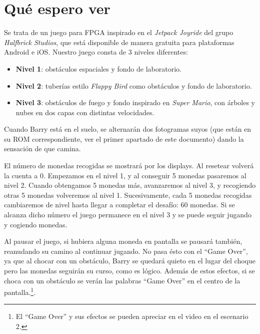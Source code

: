 \documentclass[11pt, a4paper, spanish, openright, twoside]{book}
\begin{document}
\section{Qué espero ver}
Se trata de un juego para FPGA inspirado en el  \emph{Jetpack Joyride} del grupo  \emph{Halfbrick Studios}, que está disponible de manera gratuita para plataformas Android e iOS. Nuestro juego consta de 3 niveles diferentes:

\begin{itemize}
	\item \textbf{Nivel 1}: obstáculos espaciales y fondo de laboratorio.
	\item \textbf{Nivel 2}: tuberías estilo \emph{Flappy Bird} como obstáculos y fondo de laboratorio.
	\item \textbf{Nivel 3}: obstáculos de fuego y fondo inspirado en \emph{Super Mario}, con árboles y nubes en dos capas con distintas velocidades.
\end{itemize}

Cuando Barry está en el suelo, se alternarán dos fotogramas suyos (que están en su ROM correspondiente, ver el primer apartado de este documento) dando la sensación de que camina. 

El número de monedas recogidas se mostrará por los displays. Al resetear volverá la cuenta a 0. Empezamos en el nivel 1, y al conseguir 5 monedas pasaremos al nivel 2. Cuando obtengamos 5 monedas más, avanzaremos al nivel 3, y recogiendo otras 5 monedas volveremos al nivel 1. Sucesivamente, cada 5 monedas recogidas cambiaremos de nivel hasta llegar a completar el desafío: 60 monedas. Si se alcanza dicho número el juego permanece en el nivel 3 y se puede seguir jugando y cogiendo monedas.

Al pausar el juego, si hubiera alguna moneda en pantalla se pausará también, reanudando su camino al continuar jugando. No pasa ésto con el ``Game Over'', ya que al chocar con un obstáculo, Barry se quedará quieto en el lugar del choque pero las monedas seguirán su curso, como es lógico. Además de estos efectos, si se choca con un obstáculo se verán las palabras ``Game Over'' en el centro de la pantalla.\footnote{El ``Game Over'' y sus efectos se pueden apreciar en el video en el escenario 2.}.
\end{document}
